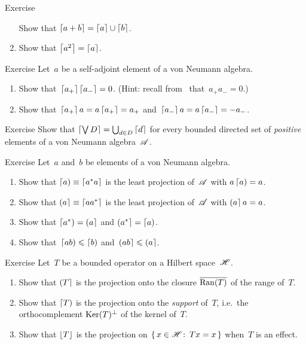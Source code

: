 \documentclass[a]{subfiles}
\begin{document}
\begin{parsec}
\begin{point}{Exercise}
\begin{enumerate}
Show that $\left\lceil a+b\right\rceil=\left\lceil a\right\rceil\cup\left\lceil b\right\rceil$.
\item
Show that $\left\lceil a^2\right\rceil=\left\lceil a\right\rceil$.
\end{enumerate}
\end{point}
\begin{point}{Exercise}%
Let~$a$ be a self-adjoint element of a von Neumann algebra.
\begin{enumerate}
\item
Show that~$\left\lceil a_+\right\rceil\left\lceil a_-\right\rceil= 0$.
(Hint: recall from~ that~$a_+a_-=0$.)
\item
	Show that~$\left\lceil a_+\right\rceil a = a\left\lceil a_+\right\rceil = a_+$
	and~$\left\lceil a_-\right\rceil a=a\left\lceil a_-\right\rceil = -a_-$.
\end{enumerate}
\end{point}
\begin{point}{Exercise}%
Show that $\left\lceil\bigvee D\right\rceil = \bigcup_{d\in D}\left\lceil d\right\rceil$
for every bounded directed set of \emph{positive}
elements of a von Neumann algebra~$\mathscr{A}$.
\end{point}
\begin{point}{Exercise}%
Let~$a$ and~$b$  be elements of a von Neumann algebra.
\begin{enumerate}
\item
Show that $\left\lceil a\right)\equiv \left\lceil a^*a\right\rceil$
is the least projection of~$\mathscr{A}$
with $a\left\lceil a\right)=a$.

\item
Show that $\left(a\right\rceil\equiv \left\lceil aa^*\right\rceil$
is the least projection of~$\mathscr{A}$
with $\left(a\right\rceil a=a$.

\item
Show that $\left\lceil a^*\right)=\left(a\right\rceil$
and $\left(a^*\right\rceil=\left\lceil a\right)$.

\item
Show that~$\left\lceil ab\right)\leqslant\left\lceil b\right)$
and~$\left(ab\right\rceil\leqslant\left(a\right\rceil$.
\end{enumerate}
\end{point}
\begin{point}{Exercise}%
Let~$T$ be a bounded operator on a Hilbert space~$\mathscr{H}$.
\begin{enumerate}
\item
Show that $\left(T\right\rceil$
is the projection onto the closure
$\overline{\operatorname{Ran}(T)}$ of the range of~$T$.
\item
Show that $\left\lceil T\right)$
is the projection onto the \emph{support}
of~$T$, i.e.~the orthocomplement
$\operatorname{Ker}(T)^\perp$ of the kernel of~$T$.
\item
Show that $\left\lfloor T\right\rfloor$ is the projection
on $\{\,x\in\mathscr{H}\colon\, Tx=x\,\}$
when~$T$ is an effect.
\end{enumerate}
\end{point}
\end{parsec}
\end{document}
